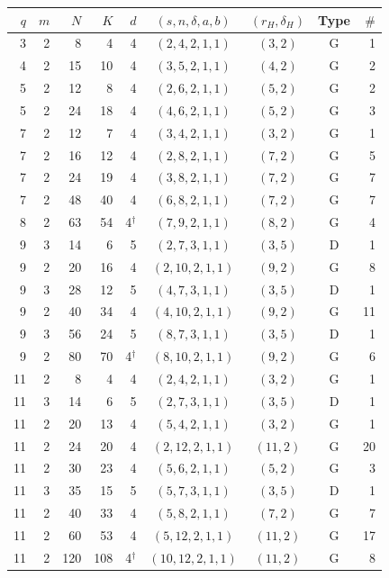 \begin{tabular}{@{}rrrrrcccr@{}}
\toprule
$q$ & $m$ & $N$ & $K$ & $d$ & $(s,n,\delta,a,b)$ & $(r_H,\delta_H)$ & Type & $\#$ \\
\midrule
3 & 2 & 8 & 4 & 4 & $(2,4,2,1,1)$ & $(3,2)$ & G & 1 \\
\midrule
4 & 2 & 15 & 10 & 4 & $(3,5,2,1,1)$ & $(4,2)$ & G & 2 \\
\midrule
5 & 2 & 12 & 8 & 4 & $(2,6,2,1,1)$ & $(5,2)$ & G & 2 \\
5 & 2 & 24 & 18 & 4 & $(4,6,2,1,1)$ & $(5,2)$ & G & 3 \\
\midrule
7 & 2 & 12 & 7 & 4 & $(3,4,2,1,1)$ & $(3,2)$ & G & 1 \\
7 & 2 & 16 & 12 & 4 & $(2,8,2,1,1)$ & $(7,2)$ & G & 5 \\
7 & 2 & 24 & 19 & 4 & $(3,8,2,1,1)$ & $(7,2)$ & G & 7 \\
7 & 2 & 48 & 40 & 4 & $(6,8,2,1,1)$ & $(7,2)$ & G & 7 \\
\midrule
8 & 2 & 63 & 54 & 4$^{\dagger}$ & $(7,9,2,1,1)$ & $(8,2)$ & G & 4 \\
\midrule
9 & 3 & 14 & 6 & 5 & $(2,7,3,1,1)$ & $(3,5)$ & D & 1 \\
9 & 2 & 20 & 16 & 4 & $(2,10,2,1,1)$ & $(9,2)$ & G & 8 \\
9 & 3 & 28 & 12 & 5 & $(4,7,3,1,1)$ & $(3,5)$ & D & 1 \\
9 & 2 & 40 & 34 & 4 & $(4,10,2,1,1)$ & $(9,2)$ & G & 11 \\
9 & 3 & 56 & 24 & 5 & $(8,7,3,1,1)$ & $(3,5)$ & D & 1 \\
9 & 2 & 80 & 70 & 4$^{\dagger}$ & $(8,10,2,1,1)$ & $(9,2)$ & G & 6 \\
\midrule
11 & 2 & 8 & 4 & 4 & $(2,4,2,1,1)$ & $(3,2)$ & G & 1 \\
11 & 3 & 14 & 6 & 5 & $(2,7,3,1,1)$ & $(3,5)$ & D & 1 \\
11 & 2 & 20 & 13 & 4 & $(5,4,2,1,1)$ & $(3,2)$ & G & 1 \\
11 & 2 & 24 & 20 & 4 & $(2,12,2,1,1)$ & $(11,2)$ & G & 20 \\
11 & 2 & 30 & 23 & 4 & $(5,6,2,1,1)$ & $(5,2)$ & G & 3 \\
11 & 3 & 35 & 15 & 5 & $(5,7,3,1,1)$ & $(3,5)$ & D & 1 \\
11 & 2 & 40 & 33 & 4 & $(5,8,2,1,1)$ & $(7,2)$ & G & 7 \\
11 & 2 & 60 & 53 & 4 & $(5,12,2,1,1)$ & $(11,2)$ & G & 17 \\
11 & 2 & 120 & 108 & 4$^{\dagger}$ & $(10,12,2,1,1)$ & $(11,2)$ & G & 8 \\

\end{tabular}
